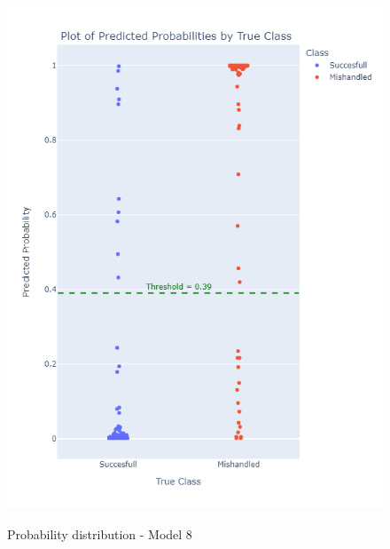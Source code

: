 \documentclass[12pt]{article}
\begin{document}
\begin{figure}
\begin{minipage}[c]{0.4\linewidth}
    \includegraphics[width=1\textwidth]{Probability_distribution_Model 8.png}\\
    \caption{Probability distribution - Model 8}
\end{minipage}%
\end{figure}
\FloatBarrier
\end{document}
